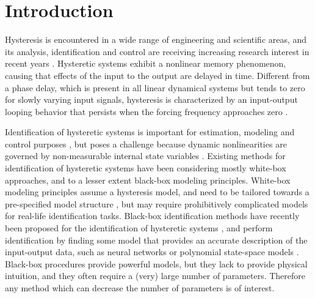 \documentclass[review]{elsarticle}
\begin{document}
\section{Introduction}
Hysteresis is encountered in a wide range of engineering and scientific areas, and its analysis, identification and control are receiving increasing research interest in recent years \cite{bern,bern1,hassani2014survey,Ikhouane11,Noel,worden2007identification,worden2012identificationI,worden2012identificationII,worden2012parameterIII}. 
Hysteretic systems exhibit a nonlinear memory phenomenon, causing that effects of the input to the output are delayed in time.
Different from a phase delay, which is present in all linear dynamical systems but tends to zero for slowly varying input signals, hysteresis is characterized by an input-output looping behavior that persists when the forcing frequency approaches zero \cite{bern1}. 

Identification of hysteretic systems is important for estimation, modeling and control purposes \cite{Ikhouane11}, but poses a challenge because dynamic nonlinearities are governed by non-measurable internal state variables \cite{Ikhouane11,Noel}. 
Existing methods for identification of hysteretic systems have been considering mostly white-box approaches, and to a lesser extent black-box modeling principles. 
White-box modeling principles assume a hysteresis model, and need to be tailored towards a pre-specified model structure \citep{Ikhouane11,li2004improvement,worden2012parameterIII}, but may require prohibitively complicated models for real-life identification tasks. 
Black-box identification methods \citep{billings2013nonlinear,schon2011system,Johan1,Johan2,nelles2013nonlinear,Paduart1} have recently been proposed for the identification of hysteretic systems \cite{Noel,worden2007identification}, and perform identification by finding some model that provides an accurate description of the input-output data, such as neural networks \cite{Anna,xie2013identification} or polynomial state-space models \cite{Paduart1,Noel}. 
Black-box procedures provide powerful models, but they lack to provide physical intuition, and they often require a (very) large number of parameters. 
Therefore any method which can decrease the number of parameters is of interest.
\end{document}
